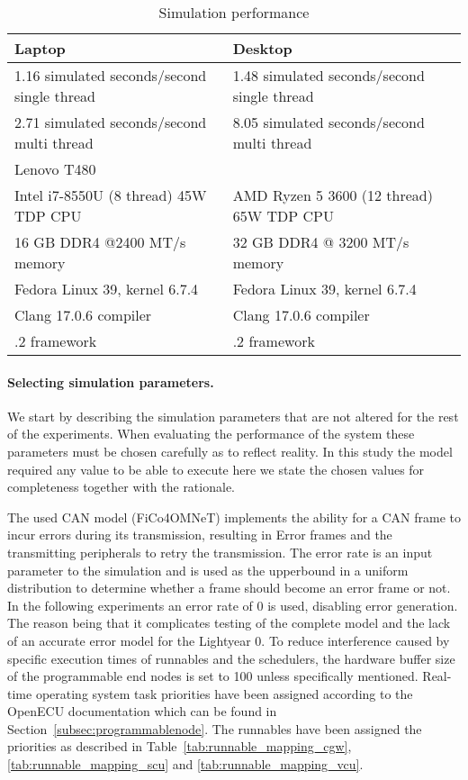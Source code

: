 \begin{table}[htb]
    \centering
    \begin{tabular}{@{}ll@{}}
    \toprule
    Laptop                                      & Desktop                                     \\ \midrule
    1.16 simulated seconds/second single thread & 1.48 simulated seconds/second single thread \\
    2.71 simulated seconds/second multi thread  & 8.05 simulated seconds/second multi thread  \\
    Lenovo T480                                 &                                             \\
    Intel i7-8550U (8 thread) 45W TDP CPU       & AMD Ryzen 5 3600 (12 thread) 65W TDP CPU    \\
    16 GB DDR4 @2400 MT/s memory                & 32 GB DDR4 @ 3200 MT/s memory               \\
    Fedora Linux 39, kernel 6.7.4               & Fedora Linux 39, kernel 6.7.4               \\
    Clang 17.0.6 compiler                       & Clang 17.0.6 compiler                       \\
    \omnet 6.0.2 framework                      & \omnet 6.0.2 framework                     \\ \bottomrule
    \end{tabular}
    \caption{Simulation performance}
    \label{tab:performance}
\end{table}

\paragraph{Selecting simulation parameters.}
We start by describing the simulation parameters that are not altered for the rest of the experiments. When evaluating the performance of the system these parameters must be chosen carefully as to reflect reality. In this study the model required any value to be able to execute here we state the chosen values for completeness together with the rationale.

The used CAN model (FiCo4OMNeT) implements the ability for a CAN frame to incur errors during its transmission, resulting in Error frames and the transmitting peripherals to retry the transmission. The error rate is an input parameter to the simulation and is used as the upperbound in a uniform distribution to determine whether a frame should become an error frame or not. In the following experiments an error rate of 0 is used, disabling error generation. The reason being that it complicates testing of the complete model and the lack of an accurate error model for the Lightyear 0. To reduce interference caused by specific execution times of runnables and the schedulers, the hardware buffer size of the programmable end nodes is set to 100 unless specifically mentioned. Real-time operating system task priorities have been assigned according to the OpenECU documentation which can be found in Section~\ref{subsec:programmablenode}. The runnables have been assigned the priorities as described in Table~\ref{tab:runnable_mapping_cgw},\ref{tab:runnable_mapping_scu} and \ref{tab:runnable_mapping_vcu}. 

